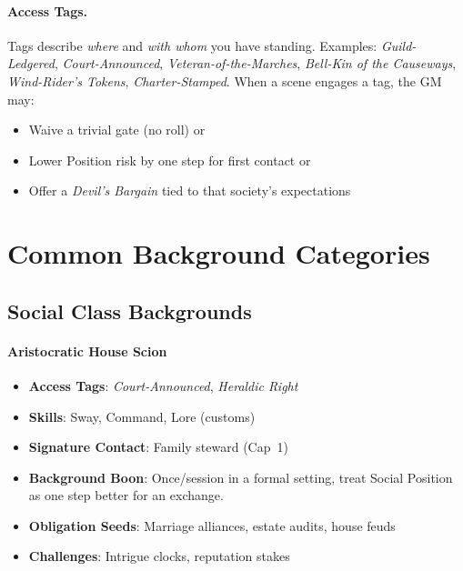 \begin{multicols}{2}
\paragraph{Access Tags.}
Tags describe \emph{where} and \emph{with whom} you have standing. Examples: \textit{Guild-Ledgered}, \textit{Court-Announced}, \textit{Veteran-of-the-Marches}, \textit{Bell-Kin of the Causeways}, \textit{Wind-Rider’s Tokens}, \textit{Charter-Stamped}. When a scene engages a tag, the GM may:
\begin{itemize}
\item Waive a trivial gate (no roll) or
\item Lower Position risk by one step for first contact or
\item Offer a \emph{Devil’s Bargain} tied to that society’s expectations
\end{itemize}

\section{Common Background Categories}

\subsection*{Social Class Backgrounds}

\paragraph{Aristocratic House Scion}
\begin{itemize}
\item \textbf{Access Tags}: \textit{Court-Announced}, \textit{Heraldic Right}
\item \textbf{Skills}: Sway, Command, Lore (customs)
\item \textbf{Signature Contact}: Family steward (Cap~1)
\item \textbf{Background Boon}: Once/session in a formal setting, treat Social Position as one step better for an exchange.
\item \textbf{Obligation Seeds}: Marriage alliances, estate audits, house feuds
\item \textbf{Challenges}: Intrigue clocks, reputation stakes
\end{itemize}


\end{multicols}
